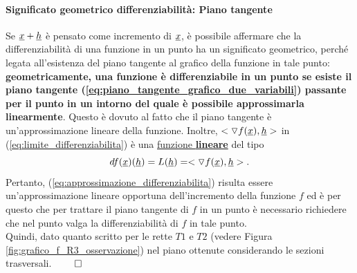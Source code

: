 \paragraph{Significato geometrico differenziabilità: Piano tangente} Se $\uline x+\uline h$ è pensato come incremento di $\uline x$, è possibile affermare che la differenziabilità di una funzione in un punto ha un significato geometrico, perché legata all'esistenza del piano tangente al grafico della funzione in tale punto: \textbf{geometricamente, una funzione è differenziabile in un punto se esiste il piano tangente (\ref{eq:piano_tangente_grafico_due_variabili}) passante per il punto in un intorno del quale è possibile approssimarla linearmente}. Questo è dovuto al fatto che il piano tangente è un'approssimazione lineare della funzione. Inoltre, $<\triangledown f(\uline x), \uline h>$ in (\ref{eq:limite_differenziabilita}) è una \uline{funzione \textbf{lineare}} del tipo
\begin{equation*}
	df(\uline x)(\uline h) = L(\uline h) = <\triangledown f(\uline x), \uline h>.
\end{equation*}
Pertanto, (\ref{eq:approssimazione_differenziabilita}) risulta essere un'approssimazione lineare opportuna dell'incremento della funzione $f$ ed è per questo che per trattare il piano tangente di $f$ in un punto è necessario richiedere che nel punto valga la differenziabilità di $f$ in tale punto.\\
Quindi, dato quanto scritto per le rette $T1$ e $T2$ (vedere Figura \ref{fig:grafico_f_R3_osservazione}) nel piano ottenute considerando le sezioni trasversali. $\qed$

